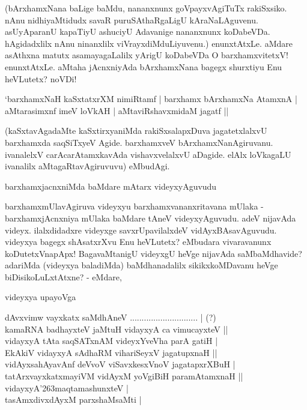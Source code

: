 (bArxhamxNana baLige baMdu, nananxnunx goVpayxvAgiTuTx rakiSxsiko. nAnu nidhiyaMtidudx savaR puruSAthaRgaLigU kAraNaLAguvenu. asUyAparanU kapaTiyU ashuciyU Adavanige nananxnunx koDabeVDa. hAgidadxlilx nAnu ninanxlilx viVrayxdiMduLiyuvenu.) enunxtAtxLe. aMdare asAthxna matutx asamayagaLalilx yArigU koDabeVDa O barxhamxvitetxV! enunxtAtxLe. aMtaha jAcnxniyAda bArxhamxNana bagegx shurxtiyu Enu heVLutetx? noVDi!

\begin{shloka}
`barxhamxNaH kaSxtatxrXM nimiRtamf | barxhamx bArxhamxNa AtamxnA |\\
aMtarasimxnf imeV loVkAH | aMtaviRshavxmidaM jagatf ||
\end{shloka}

(kaSxtavAgadaMte kaSxtirxyaniMda rakiSxsalapxDuva jagatetxlalxvU barxhamxda saqSiTxyeV Agide. barxhamxveV bArxhamxNanAgiruvanu. ivanalelxV carAcarAtamxkavAda vishavxvelalxvU aDagide. elAlx loVkagaLU ivanalilx aMtagaRtavAgiruvuvu) eMbudAgi. 

barxhamxjacnxniMda baMdare mAtarx videyxyAguvudu

barxhamxmUlavAgiruva videyxyu barxhamxvananxritavana mUlaka - barxhamxjAcnxniya mUlaka baMdare tAneV videyxyAguvudu. adeV nijavAda videyx. ilalxdidadxre videyxge savxrUpavilalxdeV vidAyxBAsavAguvudu. videyxya bagegx shAsatxrXvu Enu heVLutetx? eMbudara vivaravanunx koDutetxVnapApx! BagavaMtanigU videyxgU heVge nijavAda saMbaMdhavide? adariMda (videyxya baladiMda) baMdhanadalilx sikikxkoMDavanu heVge biDisikoLuLxtAtxne? - eMdare,

videyxya upayoVga

\begin{shloka}
dAvxvimw vayxkatx saMdhAneV ............................. | (?)\\
kamaRNA badhayxteV jaMtuH vidayxyA ca vimucayxteV ||\\

vidayxyA tAta saqSATxnAM videyxYveVha parA gatiH |\\
EkAkiV vidayxyA sAdhaRM vihariSeyxV jagatupxnaH ||\\

vidAyxsahAyavAnf deVvoV viSavxkesxVnoV jagatapxrXBuH |\\
tatArxvayxkatxmayiVM vidAyxM yoVgiBiH paramAtamxnaH ||\\

vidayxyA\char'263maqtamashunxteV |\\
tasAmxdivxdAyxM parxshaMsaMti |
\end{shloka}

